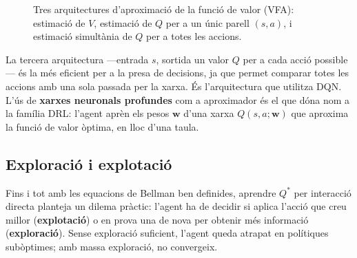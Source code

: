 \begin{figure}[H]
  \centering
  \caption[Tres arquitectures VFA d'aproximació de la funció de valor.]{Tres arquitectures d'aproximació de la funció de valor (VFA):
    estimació de $V$, estimació de $Q$ per a un únic parell $(s,a)$, i
    estimació simultània de $Q$ per a totes les accions.}
  \label{fig:vfa-tipus}
\end{figure}

La tercera arquitectura —entrada $s$, sortida un valor $Q$ per a cada
acció possible— és la més eficient per a la presa de decisions, ja que
permet comparar totes les accions amb una sola passada per la xarxa. És
l'arquitectura que utilitza \ac{DQN}. L'ús de \textbf{xarxes neuronals
profundes} com a aproximador és el que dóna nom a la família
\ac{DRL}: l'agent aprèn els pesos $\mathbf{w}$ d'una xarxa
$Q(s,a;\mathbf{w})$ que aproxima la funció de valor òptima, en lloc
d'una taula.

\FloatBarrier
\subsection*{Exploració i explotació}

Fins i tot amb les equacions de Bellman ben definides, aprendre $Q^*$ per
interacció directa planteja un dilema pràctic: l'agent ha de decidir si aplica
l'acció que creu millor (\textbf{explotació}) o en prova una de nova per
obtenir més informació (\textbf{exploració}). Sense exploració suficient,
l'agent queda atrapat en polítiques subòptimes; amb massa exploració, no
convergeix.


